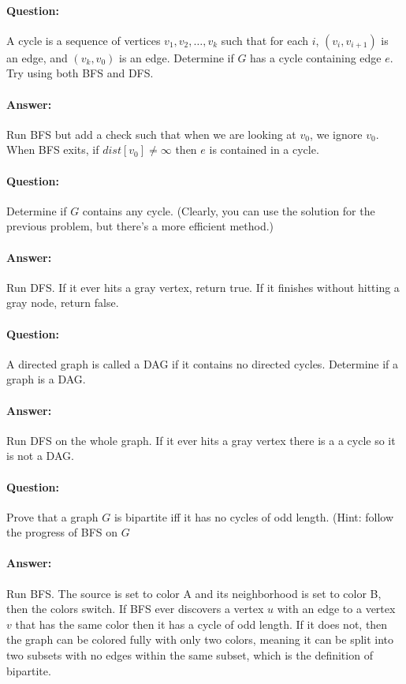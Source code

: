 \documentclass{article}
\begin{document}
\paragraph{Question:} A cycle is a sequence of vertices \(v_1, v_2, \ldots , v_k\) such that for each \(i\), \((v_i , v_{i+1})\) is an edge, and \((v_k, v_0)\) is an edge. Determine if \(G\) has a cycle containing edge \(e\). Try using both BFS and DFS.

\paragraph{Answer:} Run BFS but add a check such that when we are looking at \(v_0\), we ignore \(v_0\). When BFS exits, if \(dist[v_0] \neq \infty\) then \(e\) is contained in a cycle.

\paragraph{Question:} Determine if \(G\) contains any cycle. (Clearly, you can use the solution for the previous problem, but there’s a more efficient method.)

\paragraph{Answer:} Run DFS. If it ever hits a gray vertex, return true. If it finishes without hitting a gray node, return false.

\paragraph{Question:} A directed graph is called a DAG if it contains no directed cycles. Determine if a graph is a DAG.

\paragraph{Answer:} Run DFS on the whole graph. If it ever hits a gray vertex there is a a cycle so it is not a DAG.

\paragraph{Question:} Prove that a graph \(G\) is bipartite iff it has no cycles of odd length. (Hint: follow the progress of BFS on \(G\)

\paragraph{Answer:} Run BFS. The source is set to color A and its neighborhood is set to color B, then the colors switch. If BFS ever discovers a vertex \(u\) with an edge to a vertex \(v\) that has the same color then it has a cycle of odd length. If it does not, then the graph can be colored fully with only two colors, meaning it can be split into two subsets with no edges within the same subset, which is the definition of bipartite.
\end{document}
